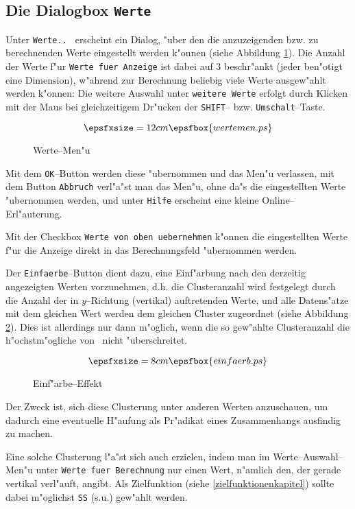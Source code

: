 \subsection*{Die Dialogbox {\tt Werte }}
Unter {\tt Werte.. }
erscheint ein Dialog, "uber den die anzuzeigenden bzw. zu berechnenden
Werte eingestellt werden k"onnen (siehe Abbildung \ref{Abbildungwertewahl}).
Die Anzahl der Werte f"ur \verb-Werte fuer Anzeige- ist 
dabei auf 3 beschr"ankt (jeder
ben"otigt eine Dimension), w"ahrend zur Berechnung beliebig viele
Werte ausgew"ahlt werden k"onnen: Die weitere Auswahl
unter \verb-weitere Werte- erfolgt durch Klicken  mit der Maus
bei gleichzeitigem Dr"ucken der \verb-SHIFT--- bzw. \verb-Umschalt---Taste.

\begin{figure}[htp]
	\[ \epsfxsize=12cm \epsfbox{wertemen.ps} \]
	\caption{\label{Abbildungwertewahl} Werte--Men"u}
\end{figure}

Mit dem \verb-OK---Button werden diese "ubernommen und das Men"u
verlassen, mit dem Button 
\verb-Abbruch- verl"a"st man das Men"u, ohne da"s die eingestellten
Werte "ubernommen werden, und unter \verb-Hilfe- erscheint
eine kleine Online--Erl"auterung.

Mit der Checkbox \verb-Werte von oben uebernehmen- k"onnen die eingestellten
Werte  f"ur die Anzeige
direkt in das Berechnungsfeld "ubernommen werden.

Der \verb-Einfaerbe---Button dient dazu, eine Einf"arbung nach den derzeitig
angezeigten Werten vorzunehmen, d.h. die Clusteranzahl wird festgelegt durch 
die Anzahl der in $y$--Richtung (vertikal) auftretenden Werte, 
und alle Datens"atze mit dem gleichen Wert werden dem gleichen Cluster
zugeordnet (siehe Abbildung \ref{special}).
Dies ist allerdings nur dann m"oglich, wenn die so gew"ahlte Clusteranzahl
die h"ochstm"ogliche von \MAXCLUSTER\ nicht "uberschreitet.


\begin{figure}[htp]
	\[ \epsfxsize=8cm \epsfbox{einfaerb.ps} \]
	\caption{\label{special} Einf"arbe--Effekt}
\end{figure}

Der Zweck ist, sich diese Clusterung unter anderen Werten anzuschauen, um 
dadurch eine eventuelle H"aufung als Pr"adikat eines Zusammenhangs ausfindig
zu machen.

Eine solche Clusterung l"a"st sich auch erzielen, indem man im
Werte--Auswahl--Men"u unter \verb-Werte fuer Berechnung- nur einen Wert,
n"amlich den, der gerade vertikal verl"auft, angibt. Als Zielfunktion
(siehe \ref{zielfunktionenkapitel}) sollte dabei m"oglichst \verb-SS- (s.u.)
gew"ahlt werden.


